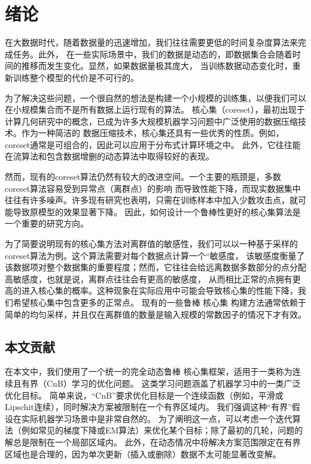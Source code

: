
\chapter{绪论}

在大数据时代，随着数据量的迅速增加，我们往往需要更低的时间复杂度算法来完成任务。此外，
在一些实际场景中，我们的数据是动态的，即数据集合会随着时间的推移而发生变化。显然，如果数据量极其庞大，
当训练数据动态变化时，重新训练整个模型的代价是不可行的。

为了解决这些问题，一个很自然的想法是构建一个小规模的训练集，以便我们可以在小规模集合而不是所有数据上运行现有的算法。
核心集（coreset）\cite{DBLP:journals/corr/abs-2011-09384}，最初出现于计算几何\cite{DBLP:journals/jacm/AgarwalHV04}研究中的概念，已成为许多大规模机器学习问题\cite{DBLP:journals/corr/BravermanFL16}\cite{DBLP:conf/gi/MunteanuSSW19}中广泛使用的数据压缩技术。作为一种简洁的
数据压缩技术，核心集还具有一些优秀的性质。例如，coreset通常是可组合的，因此可以应用于分布式计算环境之中\cite{DBLP:conf/pods/IndykMMM14}。
此外，它往往能在流算法\cite{DBLP:conf/stoc/Har-PeledM04}和包含数据增删的动态算法\cite{DBLP:conf/esa/HenzingerK20}中取得较好的表现。

然而，现有的coreset算法仍然有较大的改进空间。一个主要的瓶颈是，多数coreset算法容易受到异常点（离群点）的影响
而导致性能下降，而现实数据集中往往有许多噪声。许多现有研究也表明，只需在训练样本中加入少数攻击点，就可能导致原模型的效果显著下降。\cite{DBLP:journals/pr/BiggioR18}
因此，如何设计一个鲁棒性更好的核心集算法是一个重要的研究方向。

为了简要说明现有的核心集方法对离群值的敏感性，我们可以以一种基于采样的coreset算法为例\cite{DBLP:conf/stoc/FeldmanL11}。这个算法需要对每个数据点计算一个“敏感度，
该敏感度衡量了该数据项对整个数据集的重要程度；然而，它往往会给远离数据多数部分的点分配高敏感度，也就是说，离群点往往会有更高的敏感度，
从而相比正常的点拥有更高的进入核心集的概率。这种现象在实际应用中可能会导致核心集的性能下降，我们希望核心集中包含更多的正常点。
现有的一些鲁棒 核心集 构建方法通常依赖于简单的均匀采样\cite{DBLP:conf/stoc/FeldmanL11}\cite{DBLP:conf/focs/HuangJLW18}，并且仅在离群值的数量是输入规模的常数因子的情况下才有效。


\section{本文贡献}

在本文中，我们使用了一个统一的完全动态鲁棒 核心集框架\cite{Wang2021RobustAF}，适用于一类称为连续且有界（CnB）学习的优化问题。
这类学习问题涵盖了机器学习中的一类广泛优化目标。
简单来说，“CnB”要求优化目标是一个连续函数（例如，平滑或Lipschit连续），同时解决方案被限制在一个有界区域内。
我们强调这种“有界”假设在实际机器学习场景中是非常自然的。
为了阐明这一点，可以考虑一个迭代算法（例如常见的梯度下降或EM算法）来优化某个目标；除了最初的几轮，问题的解总是限制在一个局部区域内。
此外，在动态情况中将解决方案范围限定在有界区域也是合理的，因为单次更新（插入或删除）数据不太可能显著改变解。

